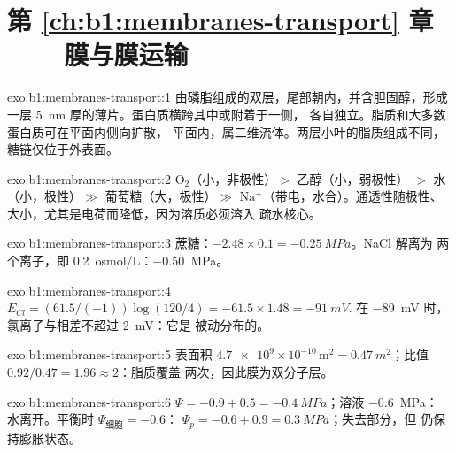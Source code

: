 \section*{第 \ref{ch:b1:membranes-transport} 章——膜与膜运输}

\begin{solution}{exo:b1:membranes-transport:1}
由磷脂组成的双层，尾部朝内，并含胆固醇，形成一层
\qty{5}{nm} 厚的薄片。蛋白质横跨其中或附着于一侧，
各自独立。脂质和大多数蛋白质可在平面内侧向扩散，
平面内，属二维流体。两层小叶的脂质组成不同，
糖链仅位于外表面。
\end{solution}

\begin{solution}{exo:b1:membranes-transport:2}
$\mathrm{O_2}$（小，非极性）$>$ 乙醇（小，弱极性）
$>$ 水（小，极性）$\gg$ 葡萄糖（大，极性）$\gg$
$\mathrm{Na^+}$（带电，水合）。通透性随极性、
大小，尤其是电荷而降低，因为溶质必须溶入
疏水核心。
\end{solution}

\begin{solution}{exo:b1:membranes-transport:3}
蔗糖：$-2.48\times 0.1 = \qty{-0.25}{MPa}$。NaCl 解离为
两个离子，即 \qty{0.2}{osmol/L}：\qty{-0.50}{MPa}。
\end{solution}

\begin{solution}{exo:b1:membranes-transport:4}
$E_{Cl} = (61.5/(-1))\log(120/4) = -61.5\times 1.48 = \qty{-91}{mV}$.
在 \qty{-89}{mV} 时，氯离子与相差不超过 \qty{2}{mV}：它是
被动分布的。
\end{solution}

\begin{solution}{exo:b1:membranes-transport:5}
表面积 $\num{4.7e9}\times 10^{-10}\,\mathrm{m^2} =
\qty{0.47}{m^2}$；比值 $0.92/0.47 = 1.96 \approx 2$：脂质覆盖
两次，因此膜为双分子层。
\end{solution}

\begin{solution}{exo:b1:membranes-transport:6}
 $\Psi = -0.9 + 0.5 = \qty{-0.4}{MPa}$；溶液 \qty{-0.6}{MPa}：
水离开。平衡时 $\Psi_{\text{细胞}} = -0.6$：
$\Psi_p = -0.6 + 0.9 = \qty{0.3}{MPa}$；失去部分，但
仍保持膨胀状态。
\end{solution}

